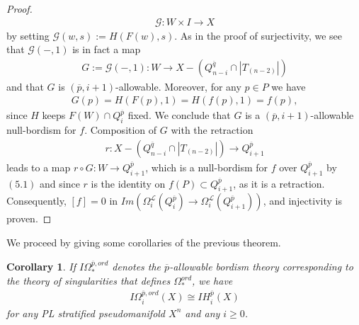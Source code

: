 \documentclass{scrreprt}
\newtheorem{corollar}[prop]{Corollary}
\begin{document}
\begin{proof}
\begin{align*}
\mathcal{G}: W \times I \to X
\end{align*}
by setting $\mathcal{G}(w,s):=H(F(w),s)$. As in the proof of surjectivity, we see that $\mathcal{G}(-,1)$ is in fact a map
\begin{align*}
G:=\mathcal{G}(-,1): W \to X-(Q_{n-i}^{\overline{q}} \cap |T_{(n-2)}|)
\end{align*}
and that $G$ is $(\overline{p},i+1)$-allowable. Moreover, for any $p \in P$ we have
\begin{align}
G(p)=H(F(p),1)=H(f(p),1)=f(p),
\end{align}
since $H$ keeps $F(W) \cap Q_i^{\overline{p}}$ fixed. We conclude that $G$ is a $(\overline{p},i+1)$-allowable null-bordism for $f$. Composition of $G$ with the retraction
\begin{align*}
r: X-(Q_{n-i}^{\overline{q}} \cap |T_{(n-2)}|) \to Q_{i+1}^{\overline{p}}
\end{align*}
leads to a map
$r \circ G : W \to Q_{i+1}^{\overline{p}}$, which is a null-bordism for $f$ over $Q_{i+1}^{\overline{p}}$ by $(5.1)$ and since $r$ is the identity on $f(P) \subset Q_{i+1}^{\overline{p}}$, as it is a retraction. Consequently, $[f] =0$ in $Im(\Omega_i^{\mathcal{L}}(Q_{i}^{\overline{p}}) \to \Omega_i^{\mathcal{L}}(Q_{i+1}^{\overline{p}}))$, and injectivity is proven.
\end{proof}

We proceed by giving some corollaries of the previous theorem.

\begin{corollar}
If $I\Omega_*^{\overline{p},ord}$ denotes the $\overline{p}$-allowable bordism theory corresponding to the theory of singularities that defines $\Omega_*^{ord}$, we have
\begin{align*}
I\Omega_i^{\overline{p},ord}(X) \cong IH_i^{\overline{p}}(X)
\end{align*}
for any PL stratified pseudomanifold $X^n$ and any $i \geq 0$.
\end{corollar}
\end{document}
